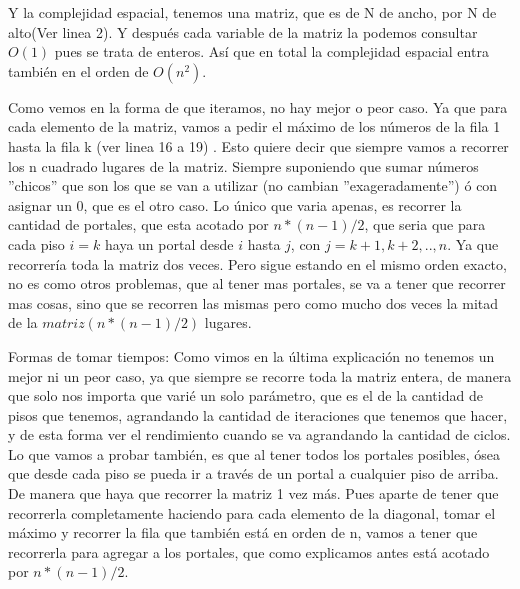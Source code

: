Y la complejidad espacial, tenemos una matriz, que es de N de ancho, por N de alto(Ver linea 2). Y después cada variable de la matriz la podemos consultar $O(1)$ pues se trata de enteros. Así que en total la complejidad espacial entra también en el orden de $O(n^2)$. \newline

Como vemos en la forma de que iteramos, no hay mejor o peor caso. Ya que para cada elemento de la matriz, vamos a pedir el máximo de los números de la fila 1 hasta la fila k (ver linea 16 a 19) . Esto quiere decir que siempre vamos a recorrer los n cuadrado lugares de la matriz. Siempre suponiendo que sumar números ''chicos'' que son los que se van a utilizar (no cambian ''exageradamente'') ó con asignar un $0$, que es el otro caso. Lo único que varia apenas, es recorrer la cantidad de portales, que esta acotado por $n*(n-1)/2$, que seria que para cada piso $i=k$ haya un portal desde $i$ hasta $j$, con $j = k+1,k+2,..,n$. Ya que recorrería toda la matriz dos veces. Pero sigue estando en el mismo orden exacto, no es como otros problemas, que al tener mas portales, se va a tener que recorrer mas cosas, sino que se recorren las mismas pero como mucho dos veces la mitad de la $matriz (n*(n-1)/2)$ lugares. \newline

Formas de tomar tiempos:
Como vimos en la última explicación no tenemos un mejor ni un peor caso, ya que siempre se recorre toda la matriz entera, de manera que solo nos importa que varié un solo parámetro, que es el de la cantidad de pisos que tenemos, agrandando la cantidad de iteraciones que tenemos que hacer, y de esta forma ver el rendimiento cuando se va agrandando la cantidad de ciclos.\newline
Lo que vamos a probar también, es que al tener todos los portales posibles, ósea que desde cada piso se pueda ir a través de un portal a cualquier piso de arriba. De manera que haya que recorrer la matriz 1 vez más. Pues aparte de tener que recorrerla completamente haciendo para cada elemento de la diagonal, tomar el máximo y recorrer la fila que también está en orden de n, vamos a tener que recorrerla para agregar a los portales,  que como explicamos antes está acotado por $n*(n-1)/2$. \newline
 




